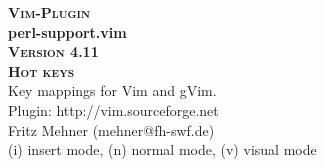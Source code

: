 \documentclass[oneside,10pt,landscape,DIV17]{scrartcl}
\newcommand{\Pluginversion}{4.11}
\begin{document}
%

\begin{multicols}{3}
%
\begin{center}
%
\textbf{\textsc{\small{Vim-Plugin}}}\\
\textbf{\LARGE{perl-support.vim}}\\
\textbf{\textsc{\small{Version \Pluginversion}}}\\
\vspace{5mm}%
\textbf{\textsc{\Huge{Hot keys}}}\\ 
\vspace{5mm}%
Key mappings for Vim and gVim.\\
Plugin: http://vim.sourceforge.net\\
Fritz Mehner (mehner@fh-swf.de)\\
\vspace{1.0mm}
{\normalsize (i)} insert mode, {\normalsize (n)} normal mode, {\normalsize (v)} visual mode\\
\vspace{4.0mm}


\end{center}
\end{multicols}
\end{document}
